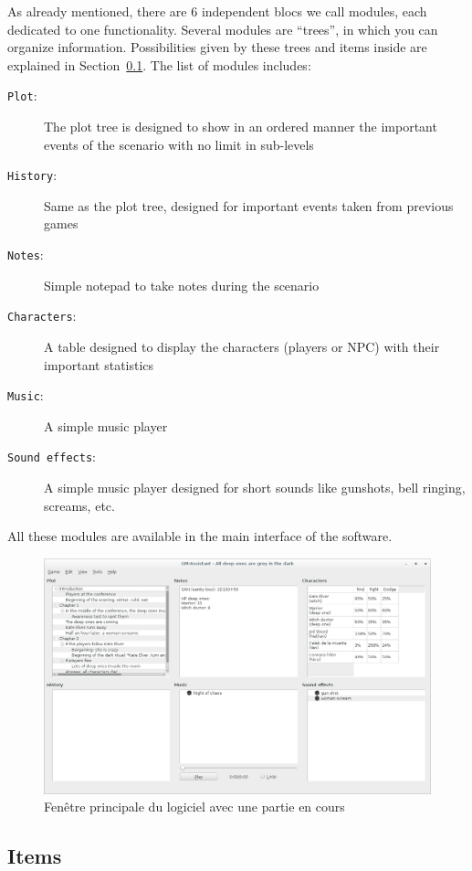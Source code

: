 \documentclass[a4paper,12pt]{article}
\newcommand*{\interfaceitem}[1]{\texttt{#1}}
\begin{document}
As already mentioned, there are 6 independent blocs we call modules, each dedicated to one functionality. Several modules are ``trees'', in which you can organize information. Possibilities given by these trees and items inside are explained in Section~\ref{item}.
The list of modules includes:
\begin{description}
    \item[\interfaceitem{Plot}:]{The plot tree is designed to show in an ordered manner the important events of the scenario with no limit in sub-levels}
    \item[\interfaceitem{History}:]{Same as the plot tree, designed for important events taken from previous games}
    \item[\interfaceitem{Notes}:]{Simple notepad to take notes during the scenario}
    \item[\interfaceitem{Characters}:]{A table designed to display the characters (players or NPC) with their important statistics}
    \item[\interfaceitem{Music}:]{A simple music player}
    \item[\interfaceitem{Sound effects}:]{A simple music player designed for short sounds like gunshots, bell ringing, screams, etc.}
\end{description}
All these modules are available in the main interface of the software.
\begin{figure}[ht]
    \centerline{\includegraphics[width=\textwidth]{full_scenario}}
    \caption{Fenêtre principale du logiciel avec une partie en cours}
    \label{fig:interface}
\end{figure}

\subsection{Items}
\label{item}
\end{document}
